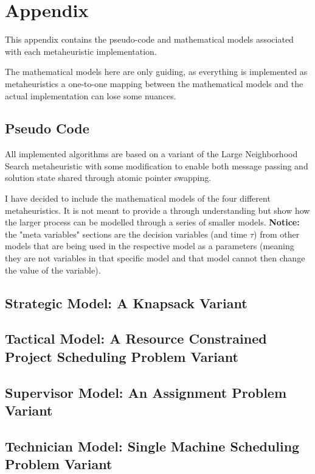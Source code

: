 \newpage
\section{Appendix}
This appendix contains the pseudo-code and mathematical models associated with each metaheuristic implementation. 

The mathematical models here are only guiding, as everything is implemented as metaheuristics a one-to-one mapping
between the mathematical models and the actual implementation can lose some nuances.

\subsection*{Pseudo Code}

All implemented algorithms are based on a variant of the Large Neighborhood Search metaheuristic with some modification to enable both message
passing and solution state shared through atomic pointer swapping. 

\begin{figure}[H]
	
\end{figure}

I have decided to include the mathematical models of the four different metaheuristics. It is not meant to provide a through understanding
but show how the larger process can be modelled through a series of smaller models. \textbf{Notice:} the "meta variables" sections are
the decision variables (and time $\tau$) from other models that are being used in the respective model as a parameters (meaning they are 
not variables in that specific model and that model cannot then change the value of the variable).

\newpage
\subsection*{Strategic Model: A Knapsack Variant}

\newpage
\subsection*{Tactical Model: A Resource Constrained Project Scheduling Problem Variant}

\newpage
\subsection*{Supervisor Model: An Assignment Problem Variant}

\newpage
\subsection*{Technician Model: Single Machine Scheduling Problem Variant}

